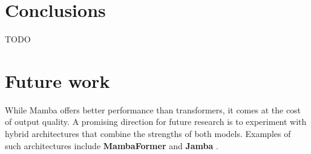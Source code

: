 \documentclass[conference,compsoc]{IEEEtran}
\begin{document}
\section{Conclusions}
TODO

\section{Future work}
While Mamba offers better performance than transformers, it comes at the cost of output quality. A promising direction for future research is to experiment with hybrid architectures that combine the strengths of both models. Examples of such architectures include \textbf{MambaFormer} \cite{mambaformer} and \textbf{Jamba} \cite{jamba}.

%
%



%
%
\end{document}
